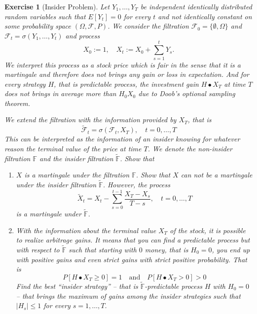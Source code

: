 \documentclass[DIV=classic,a4paper,10pt]{scrartcl}
\newtheorem{exercise}[theorem]{Exercise}
\theoremstyle{nonumberplain}
\newtheorem{proof}{Proof}
\numberwithin{equation}{section}
\begin{document}

\begin{exercise}[Insider Problem]
    Let $Y_1,\ldots, Y_T$ be independent identically distributed random variables such that $E[Y_t]=0$ for every $t$ and not identically constant on some probability space $(\Omega,\mathcal{F}, P)$.
    We consider the filtration $\mathcal{F}_0=\{\emptyset,\Omega\}$ and $\mathcal{F}_t=\sigma(Y_1,\ldots,Y_t)$ and process
    \begin{equation*}
        X_0:=1,\quad X_t:=X_0+\sum_{s=1}^t Y_s.
    \end{equation*}
    We interpret this process as a stock price which is fair in the sense that it is a martingale and therefore does not brings any gain or loss in expectation.
    And for every strategy $H$, that is predictable process, the investment gain $H\bullet X_T$ at time $T$ does not brings in average more than $H_0X_0$ due to Doob's optional sampling theorem.

    We extend the filtration with the information provided by $X_T$, that is
    \begin{equation*}
        \tilde{\mathcal{F}}_t=\sigma(\mathcal{F}_t,X_T), \quad t=0,\ldots,T
    \end{equation*}
    This can be interpreted as the information of an insider knowing for whatever reason the terminal value of the price at time $T$.
    We denote the non-insider filtration $\mathbb{F}$ and the insider filtration $\tilde{\mathbb{F}}$.
    Show that
    \begin{enumerate}[label=\textit{(\roman*)},fullwidth]
    \item $X$ is a martingale under the filtration $\mathbb{F}$.
        Show that $X$ can not be a martingale under the insider filtration $\tilde{\mathbb{F}}$.
        However, the process
        \begin{equation*}
            \tilde{X}_t=X_t-\sum_{s=0}^{t-1}\frac{X_T-X_s}{T-s}, \quad t=0,\ldots, T
        \end{equation*}
        is a martingale under $\tilde{\mathbb{F}}$.
    \item With the information about the terminal value $X_T$ of the stock, it is possible to realize arbitrage gains.
        It means that you can find a predictable process but with respect to $\tilde{\mathbb{F}}$ such that starting with $0$ money, that is $H_0=0$, you end up with positive gains and even strict gains with strict positive probability.
        That is
        \begin{equation*}
            P\left[ H\bullet X_T \geq 0 \right]=1\quad\text{and}\quad P\left[ H\bullet X_T> 0 \right]>0
        \end{equation*}
        Find the best ``insider strategy'' -- that is $\tilde{\mathbb{F}}$-predictable process $H$ with $H_0=0$ -- that brings the maximum of gains among the insider strategies such that $|H_s|\leq 1$ for every $s=1,\ldots,T$.
    \end{enumerate} 
\end{exercise}
\end{document}
